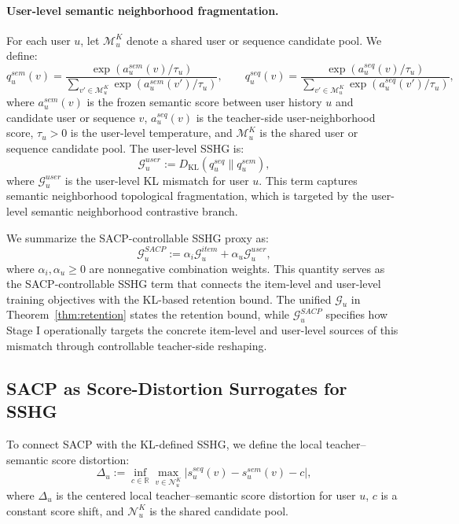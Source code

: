 ﻿\documentclass{article}
\begin{document}
\paragraph{User-level semantic neighborhood fragmentation.}
For each user $u$, let $\mathcal M_u^K$ denote a shared user or sequence candidate pool. We define:
\begin{equation}
q_u^{sem}(v)
=
\frac{\exp(a_u^{sem}(v)/\tau_u)}
{\sum_{v'\in\mathcal M_u^K}\exp(a_u^{sem}(v')/\tau_u)},
\qquad
q_u^{seq}(v)
=
\frac{\exp(a_u^{seq}(v)/\tau_u)}
{\sum_{v'\in\mathcal M_u^K}\exp(a_u^{seq}(v')/\tau_u)},
\label{eq:user_soft_dist}
\end{equation}
where $a_u^{sem}(v)$ is the frozen semantic score between user history $u$ and candidate user or sequence $v$, $a_u^{seq}(v)$ is the teacher-side user-neighborhood score, $\tau_u>0$ is the user-level temperature, and $\mathcal M_u^K$ is the shared user or sequence candidate pool. The user-level SSHG is:
\begin{equation}
\mathcal G_u^{user}
:=
D_{\mathrm{KL}}(q_u^{seq}\|q_u^{sem}),
\label{eq:user_sshg}
\end{equation}
where $\mathcal G_u^{user}$ is the user-level KL mismatch for user $u$. This term captures semantic neighborhood topological fragmentation, which is targeted by the user-level semantic neighborhood contrastive branch.

We summarize the SACP-controllable SSHG proxy as:
\begin{equation}
\mathcal G_u^{SACP}
:=
\alpha_i\mathcal G_u^{item}
+
\alpha_u\mathcal G_u^{user},
\label{eq:sacp_sshg}
\end{equation}
where $\alpha_i,\alpha_u\ge 0$ are nonnegative combination weights. This quantity serves as the SACP-controllable SSHG term that connects the item-level and user-level training objectives with the KL-based retention bound.
The unified $\mathcal G_u$ in Theorem~\ref{thm:retention} states the retention bound, while $\mathcal G_u^{SACP}$ specifies how Stage I operationally targets the concrete item-level and user-level sources of this mismatch through controllable teacher-side reshaping.

\subsection{SACP as Score-Distortion Surrogates for SSHG}
\label{app:theory_surrogate}

To connect SACP with the KL-defined SSHG, we define the local teacher--semantic score distortion:
\begin{equation}
\Delta_u
:=
\inf_{c\in\mathbb R}
\max_{v\in\mathcal N_u^K}
\left|s_u^{seq}(v)-s_u^{sem}(v)-c\right|,
\label{eq:delta_u}
\end{equation}
where $\Delta_u$ is the centered local teacher--semantic score distortion for user $u$, $c$ is a constant score shift, and $\mathcal N_u^K$ is the shared candidate pool.
\end{document}

